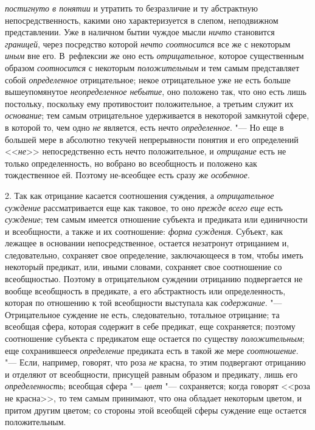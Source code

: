 {\em постигнуто в понятии}
и утратить то безразличие и ту абстрактную
непосредственность, какими оно характеризуется в слепом, неподвижном
представлении. Уже в наличном бытии чуждое мысли
{\em ничто} становится
{\em границей}, через
посредство которой {\em нечто
соотносится} все же с некоторым
{\em иным} вне его. В~рефлексии же оно есть
{\em отрицательное},
которое существенным образом
{\em соотносится} с
некоторым {\em положительным}
и тем самым представляет собой
{\em определенное}
отрицательное; некое отрицательное уже не есть больше
вышеупомянутое {\em неопределенное
небытие}, оно положено так, что оно есть лишь постольку,
поскольку ему противостоит положительное, а третьим служит их
{\em основание}; тем
самым отрицательное удерживается в некоторой замкнутой сфере, в которой то,
чем одно {\em не}
является, есть нечто
{\em определенное}. "--- Но
еще в большей мере в абсолютно текучей непрерывности понятия и его
определений <<{\em не}>>
непосредственно есть нечто положительное, и
{\em отрицание} есть не
только определенность, но вобрано во всеобщность и положено как
тождественное ей. Поэтому не-всеобщее есть сразу же
{\em особенное}.

2. Так как отрицание касается соотношения суждения, а
{\em отрицательное суждение}
рассматривается еще как таковое, то оно
{\em прежде всего еще}
есть {\em суждение};
тем самым имеется отношение субъекта и предиката или
единичности и всеобщности, а также и их соотношение:
{\em форма суждения}.
Субъект, как лежащее в основании непосредственное, остается
незатронут отрицанием и, следовательно, сохраняет свое определение,
заключающееся в том, чтобы иметь некоторый предикат, или, иными словами,
сохраняет свое соотношение со всеобщностью. Поэтому в отрицательном
суждении отрицанию подвергается не вообще всеобщность в предикате, а его
абстрактность или определенность, которая по отношению к той всеобщности
выступала как {\em содержание}. "---
Отрицательное суждение не есть, следовательно, тотальное
отрицание; та всеобщая сфера, которая содержит в себе предикат, еще
сохраняется; поэтому соотношение субъекта с предикатом еще остается по
существу {\em положительным};
еще сохранившееся
{\em определение}
предиката есть в такой же мере
{\em соотношение}. "---
Если, например, говорят, что роза
{\em не} красна, то этим
подвергают отрицанию и отделяют от всеобщности, присущей равным образом и
предикату, лишь его
{\em определенность};
всеобщая сфера
"--- {\em цвет}
"--- сохраняется; когда говорят <<роза не красна>>, то тем самым
принимают, что она обладает некоторым цветом, и притом другим цветом; со
стороны этой всеобщей сферы суждение еще остается положительным.

